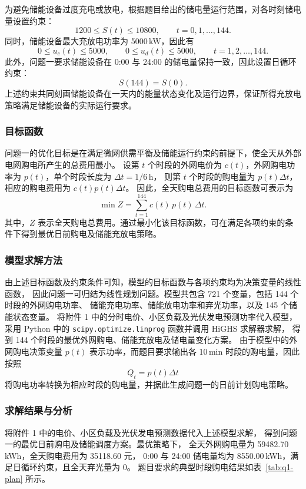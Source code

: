 为避免储能设备过度充电或放电，根据题目给出的储电量运行范围，对各时刻储电量设置约束：
\begin{equation}
1200\le S(t)\le 10800,\qquad t=0,1,\dots,144 .
\end{equation}
同时，储能设备最大充放电功率为 5000\,kW，因此有
\begin{equation}
0\le u_c(t)\le 5000,\qquad 0\le u_d(t)\le 5000,\qquad t=1,2,\dots,144 .
\end{equation}
此外，问题一要求储能设备在 0:00 与 24:00 的储电量保持一致，因此设置日循环约束：
\begin{equation}
S(144)=S(0).
\end{equation}
上述约束共同刻画储能设备在一天内的能量状态变化及运行边界，保证所得充放电策略满足储能设备的实际运行要求。

\subsubsection{目标函数}
问题一的优化目标是在满足微网供需平衡及储能运行约束的前提下，使全天从外部电网购电所产生的总费用最小。
设第 $t$ 个时段的外网电价为 $c(t)$，外网购电功率为 $p(t)$，单个时段长度为 $\Delta t=1/6$\,h，
则第 $t$ 个时段的购电量为 $p(t)\Delta t$，相应的购电费用为 $c(t)p(t)\Delta t$。
因此，全天购电总费用的目标函数可表示为
\begin{equation}
\min Z=\sum_{t=1}^{144} c(t)\,p(t)\,\Delta t .
\end{equation}
其中，$Z$ 表示全天购电总费用。通过最小化该目标函数，可在满足各项约束的条件下得到最优日前购电及储能充放电策略。

\subsubsection{模型求解方法}
由上述目标函数及约束条件可知，模型的目标函数与各项约束均为决策变量的线性函数，
因此问题一可归结为线性规划问题。模型共包含 721 个变量，包括 144 个时段的外网购电功率、
储能充电功率、储能放电功率和弃光功率，以及 145 个储能状态变量。
将附件 1 中的分时电价、小区负载及光伏发电预测功率代入模型，
采用 Python 中的 \texttt{scipy.optimize.linprog} 函数并调用 HiGHS 求解器求解，
得到 144 个时段的最优外网购电、储能充放电及储电量变化方案。
由于模型中的外网购电决策变量 $p(t)$ 表示功率，而题目要求输出各 10\,min 时段的购电量，因此按照
\begin{equation}
Q_t=p(t)\Delta t
\end{equation}
将购电功率转换为相应时段的购电量，并据此生成问题一的日前计划购电策略。

\subsubsection{求解结果与分析}
将附件 1 中的电价、小区负载及光伏发电预测数据代入上述模型求解，
得到问题一的最优日前购电及储能调度方案。最优策略下，
全天外网购电量为 59482.70\,kWh，全天购电费用为 35118.60 元，
0:00 与 24:00 储电量均为 8550.00\,kWh，满足日循环约束，且全天弃光量为 0。
题目要求的典型时段购电结果如表~\ref{tab:q1-plan} 所示。

